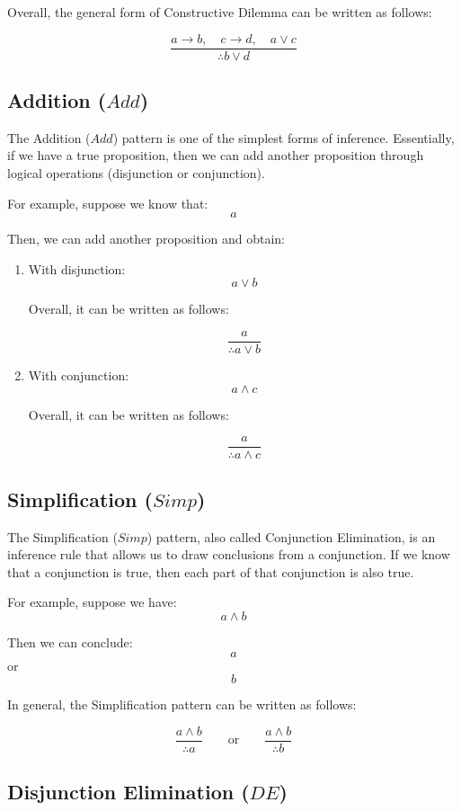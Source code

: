 \documentclass[12pt,a4paper,openany]{article}
\begin{document}
Overall, the general form of Constructive Dilemma can be written as follows:

\[
\frac{a \to b, \quad c \to d, \quad a \lor c}{\therefore b \lor d}
\]

\subsection{Addition (\(Add\))}\label{addition-add}

The Addition (\(Add\)) pattern is one of the simplest forms of inference. Essentially, if we have a true proposition, then we can add another proposition through logical operations (disjunction or conjunction).

For example, suppose we know that:
\[a\]

Then, we can add another proposition and obtain:

\begin{enumerate}
\item With disjunction:
  \[a \lor b\]

  Overall, it can be written as follows:

  \[
   \frac{a}{\therefore a \lor b}
   \]
\item With conjunction:
  \[a \land c\]

  Overall, it can be written as follows:

  \[
   \frac{a}{\therefore a \land c}
   \]
\end{enumerate}

\subsection{Simplification (\(Simp\))}\label{simplification-simp}

The Simplification (\(Simp\)) pattern, also called Conjunction Elimination, is an inference rule that allows us to draw conclusions from a conjunction. If we know that a conjunction is true, then each part of that conjunction is also true.

For example, suppose we have:
\[a \land b\]

Then we can conclude:
\[a\]
or
\[b\]

In general, the Simplification pattern can be written as follows:

\[
\frac{a \land b}{\therefore a}
\qquad \text{or} \qquad
\frac{a \land b}{\therefore b}
\]

\subsection{Disjunction Elimination (\(DE\))}\label{disjunction-elimination-de}
\end{document}
